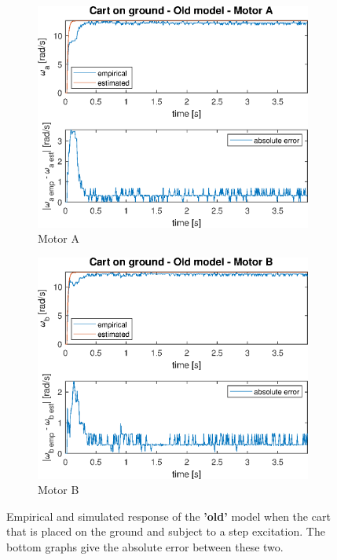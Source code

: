 \documentclass[a4paper,kul]{kulakarticle} %
\begin{document}
\begin{figure}[htp!]
	\centering
	\begin{subfigure}[b]{0.49\textwidth}
		\centering
		\includegraphics[width=\textwidth]{step_response_g_a.eps}
		\caption{Motor A}
	\end{subfigure}
	\hfill
	\begin{subfigure}[b]{0.49\textwidth}  
		\centering 
		\includegraphics[width=\textwidth]{step_response_g_b.eps}
		\caption{Motor B}
	\end{subfigure}
	\caption[Cart on the ground, old model]{Empirical and simulated response of the \textbf{'old'} model when the cart that is placed on the ground and subject to a step excitation. The bottom graphs give the absolute error between these two.} 
	\label{fig:step_ground}
\end{figure}
\end{document}
